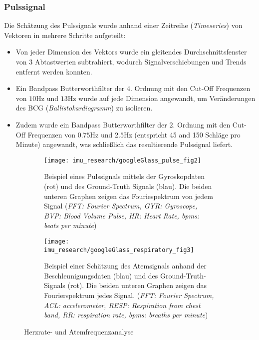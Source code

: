\subsubsection{Pulssignal}
Die Schätzung des Pulssignals wurde anhand einer Zeitreihe (\textit{Timeseries}) von Vektoren in mehrere Schritte aufgeteilt:
\begin{itemize}
    \item Von jeder Dimension des Vektors wurde ein gleitendes Durchschnittsfenster von 3 Abtastwerten subtrahiert, wodurch Signalverschiebungen und Trends entfernt werden konnten.
    \item Ein Bandpass Butterworthfilter der 4. Ordnung mit den Cut-Off Frequenzen von $10 \si{\hertz}$ und $13 \si{\hertz}$ wurde auf jede Dimension angewandt, um Veränderungen des BCG (\textit{Ballistokardiogramm}) zu isolieren.
    \item Zudem wurde ein Bandpass Butterworthfilter der 2. Ordnung mit den Cut-Off Frequenzen von $0.75 \si{\hertz}$ und $2.5 \si{\hertz}$ (entspricht 45 and 150 Schläge pro Minute) angewandt, was schließlich das resultierende Pulssignal liefert.
\end{itemize}

\begin{figure}[ht]
    \centering
    \begin{subfigure}{.49\textwidth}
        \texttt{[image: imu\_research/googleGlass\_pulse\_fig2]}
      \caption{Beispiel eines Pulssignals mittels der Gyroskopdaten (rot) und des Ground-Truth Signals (blau). Die beiden unteren Graphen zeigen das Fouriespektrum von jedem Signal (\textit{FFT: Fourier Spectrum, GYR: Gyroscope, BVP: Blood Volume Pulse, HR: Heart Rate, bpms: beats per minute})}
      \label{background:googleGlass:pulse_wave}
    \end{subfigure}
    \begin{subfigure}{.49\textwidth}
        \texttt{[image: imu\_research/googleGlass\_respiratory\_fig3]}
      \caption{Beispiel einer Schätzung des Atemsignals anhand der Beschleunigungsdaten (blau) und des Ground-Truth-Signals (rot). Die beiden unteren Graphen zeigen das Fourierspektrum jedes Signal. (\textit{FFT: Fourier Spectrum, ACL: accelerometer, RESP: Respiration from chest band, RR: respiration rate, bpms: breaths per minute})}
      \label{background:googleGlass:respiratory_wave}
    \end{subfigure}
    \caption{Herzrate- und Atemfrequenzanalyse}
    \label{background:googleGlass}
  \end{figure}

